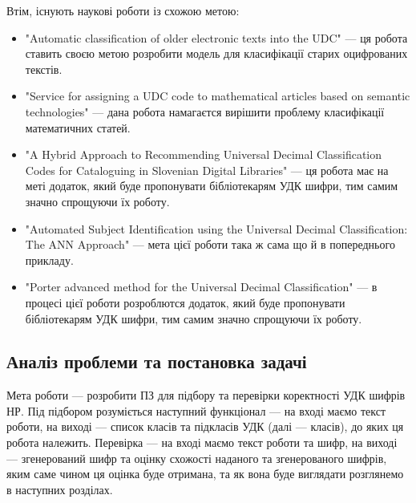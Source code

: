 \documentclass[14pt]{extarticle}
\begin{document}
  Втім, існують наукові роботи із схожою метою:
  \begin{itemize}[labelindent=\dimexpr{}\relax, leftmargin=*]
    \item "Automatic classification of older electronic texts into the UDC"
      \cite{kragelj_automatic_udc_classification}
      --- ця робота ставить своєю метою розробити модель для
      класифікації старих оцифрованих текстів.
    
    \item "Service for assigning a UDC code
	    to mathematical articles based on semantic technologies"
      \cite{almukhametov_udc_code_for_math_articles} --- 
      дана робота намагаєтся вирішити проблему класифікації математичних статей.
    
    \item "A Hybrid Approach to Recommending
      Universal Decimal Classification Codes
      for Cataloguing in Slovenian Digital Libraries"
      \cite{borovic_hybrid_udc_recommendation} ---
      ця робота має на меті додаток,
      який буде пропонувати бібліотекарям УДК шифри,
      тим самим значно спрощуючи їх роботу.

    \item "Automated Subject Identification using the
      Universal Decimal Classification: The ANN Approach"
      \cite{roy_ann_approach} ---
      мета цієї роботи така ж сама що й в попереднього прикладу.

    \item "Porter advanced method for the Universal Decimal Classification"
      \cite{tretyakov_porter} --- 
      в процесі цієї роботи розроблются додаток,
      який буде пропонувати бібліотекарям УДК шифри,
      тим самим значно спрощуючи їх роботу.

  \end{itemize}

  \subsection{Аналіз проблеми та постановка задачі}
  Мета роботи ---
  розробити ПЗ для підбору та перевірки коректності УДК шифрів НР.
  Під підбором розуміється наступний функціонал --- на вході маємо текст роботи,
  на виході --- список класів та підкласів УДК (далі --- класів),
  до яких ця робота належить.
  Перевірка --- на вході маємо текст роботи та шифр,
  на виході --- згенерований шифр та оцінку схожості наданого
  та згенерованого шифрів, яким саме чином ця оцінка буде отримана,
  та як вона буде виглядати розглянемо в наступних розділах.
  
\end{document}

